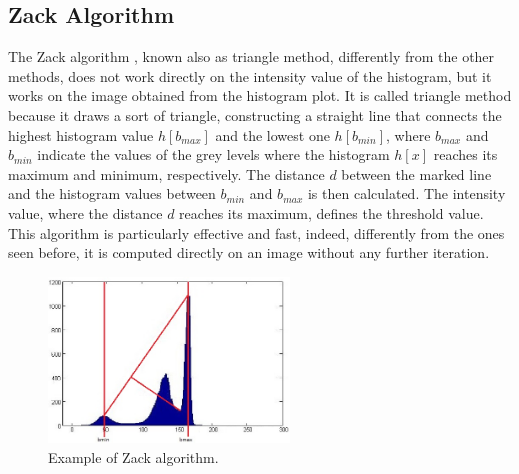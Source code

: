 \documentclass[final,a4paper,12pt,english]{UnicaPhdThesis3}
\begin{document}
\subsection{Zack Algorithm} \label{Zack} %
The Zack algorithm \cite{Zack}, known also as triangle method, differently from the other methods, does not work directly on the intensity value of the histogram, but it works on the image obtained from the histogram plot. It is called triangle method because it draws a sort of triangle, constructing a straight line that connects the highest histogram value $h[b_{max}]$ and the lowest one $h[b_{min}]$, where $b_{max}$ and $ b_{min}$ indicate the values of the grey levels where the histogram $h[x]$ reaches its maximum and minimum, respectively. The distance $d$ between the marked line and the histogram values between $b_{min}$ and $b_{max}$ is then calculated. The intensity value, where the distance $d$ reaches its maximum, defines the threshold value. This algorithm is particularly effective and fast, indeed, differently from the ones seen before, it is computed directly on an image without any further iteration.

\begin{figure}[!tbp]
\centering
\includegraphics[width=0.57\textwidth]{images/Zack}
\caption{\label{fig:exampleZack}Example of Zack algorithm.}
\end{figure}
\end{document}
